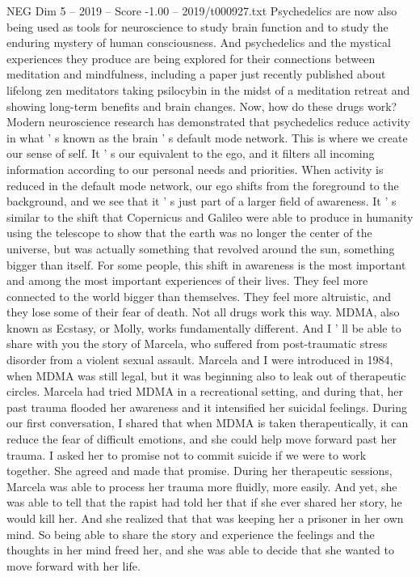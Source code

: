 \begin{textsample}{NEG Dim 5 – 2019 – Score -1.00 – 2019/t000927.txt}
Psychedelics are now also being used as tools for neuroscience to study brain function and to study the enduring mystery of human consciousness.
And psychedelics and the mystical experiences they produce are being explored for their connections between meditation and mindfulness, including a paper just recently published about lifelong zen meditators taking psilocybin in the midst of a meditation retreat and showing long-term benefits and brain changes.
Now, how do these drugs work?
Modern neuroscience research has demonstrated that psychedelics reduce activity in what ' s known as the brain ' s default mode network.
This is where we create our sense of self.
It ' s our equivalent to the ego, and it filters all incoming information according to our personal needs and priorities.
When activity is reduced in the default mode network, our ego shifts from the foreground to the background, and we see that it ' s just part of a larger field of awareness.
It ' s similar to the shift that Copernicus and Galileo were able to produce in humanity using the telescope to show that the earth was no longer the center of the universe, but was actually something that revolved around the sun, something bigger than itself.
For some people, this shift in awareness is the most important and among the most important experiences of their lives.
They feel more connected to the world bigger than themselves.
They feel more altruistic, and they lose some of their fear of death.
Not all drugs work this way.
MDMA, also known as Ecstasy, or Molly, works fundamentally different.
And I ' ll be able to share with you the story of Marcela, who suffered from post-traumatic stress disorder from a violent sexual assault.
Marcela and I were introduced in 1984, when MDMA was still legal, but it was beginning also to leak out of therapeutic circles.
Marcela had tried MDMA in a recreational setting, and during that, her past trauma flooded her awareness and it intensified her suicidal feelings.
During our first conversation, I shared that when MDMA is taken therapeutically, it can reduce the fear of difficult emotions, and she could help move forward past her trauma.
I asked her to promise not to commit suicide if we were to work together.
She agreed and made that promise.
During her therapeutic sessions, Marcela was able to process her trauma more fluidly, more easily.
And yet, she was able to tell that the rapist had told her that if she ever shared her story, he would kill her.
And she realized that that was keeping her a prisoner in her own mind.
So being able to share the story and experience the feelings and the thoughts in her mind freed her, and she was able to decide that she wanted to move forward with her life.

\end{textsample}
